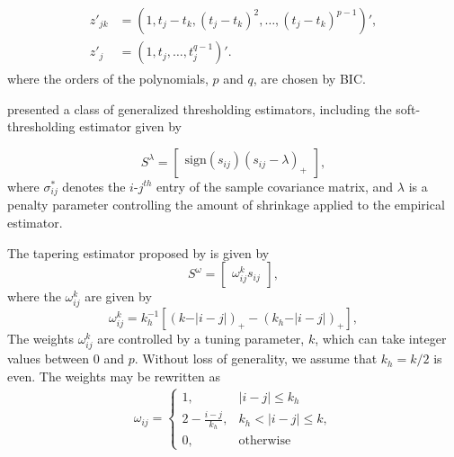 \begin{align}
\begin{split} 
z'_{jk} &= \left(1, t_j - t_k, \left(t_j - t_k\right)^2,\dots, \left(t_j - t_k\right)^{p-1}\right)', \\
z'_{j}  &= \left(1, t_j, \dots, t_j^{q-1}\right)'.
\end{split}
\end{align} \label{eq:mcd-polynomial-model}
\noindent
where the orders of the polynomials, $p$ and $q$, are chosen by BIC. 

\bigskip

\cite{rothman2009generalized} presented a class of generalized thresholding estimators, including the soft-thresholding estimator given by

\[
S^{\lambda}=   \begin{bmatrix} \mbox{sign}\left(s_{ij}\right) \left(s_{ij} - \lambda\right)_+ \end{bmatrix},
\]
\noindent 
where $\sigma^*_{ij}$ denotes the $i$-$j^{th}$ entry of the sample covariance matrix, and $\lambda$ is a penalty parameter controlling the amount of shrinkage applied to the empirical estimator. 

\bigskip

The tapering estimator proposed by \cite{cai2010optimal} is given by
\[
S^{\omega} =  \begin{bmatrix} \omega_{ij}^k s_{ij} \end{bmatrix},
\]
\noindent
where the $\omega_{ij}^k$ are given by 
\begin{equation*}
\omega^k_{ij} = k_h^{-1} \left[ \left( k - \vert i-j\vert\right)_+ - \left(k_h - \vert i-j\vert\right)_+ \right],
\end{equation*}
\noindent
The weights $\omega^k_{ij}$ are controlled by a tuning parameter, $k$,  which can take integer values between 0 and $p$. Without loss of generality,  we assume that $k_h = k/2$ is even. The weights may be rewritten as
\begin{align*}
\omega_{ij} = \left\{\begin{array}{ll} 1, & \vert i -j \vert \le k_h \\
                             2 - \frac{i - j}{k_h}, & k_h < \vert  i -j \vert \le k, \\
                             0, & \mbox{otherwise}  \end{array} \right.
\end{align*}
\noindent

\bigskip

